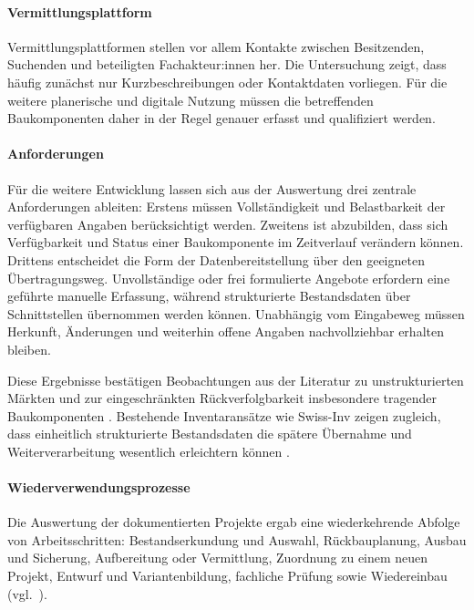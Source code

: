 \documentclass[type=zwischenbericht]{zukunftbau}
\begin{document}
\begin{SemioNest}
\begin{SemioNest}
\paragraph{Vermittlungsplattform}
Vermittlungsplattformen stellen vor allem Kontakte zwischen Besitzenden, Suchenden und beteiligten Fachakteur:innen her. Die Untersuchung zeigt, dass häufig zunächst nur Kurzbeschreibungen oder Kontaktdaten vorliegen. Für die weitere planerische und digitale Nutzung müssen die betreffenden Baukomponenten daher in der Regel genauer erfasst und qualifiziert werden.

\paragraph{Anforderungen}
Für die weitere Entwicklung lassen sich aus der Auswertung drei zentrale Anforderungen ableiten: Erstens müssen Vollständigkeit und Belastbarkeit der verfügbaren Angaben berücksichtigt werden. Zweitens ist abzubilden, dass sich Verfügbarkeit und Status einer Baukomponente im Zeitverlauf verändern können. Drittens entscheidet die Form der Datenbereitstellung über den geeigneten Übertragungsweg. Unvollständige oder frei formulierte Angebote erfordern eine geführte manuelle Erfassung, während strukturierte Bestandsdaten über Schnittstellen übernommen werden können. Unabhängig vom Eingabeweg müssen Herkunft, Änderungen und weiterhin offene Angaben nachvollziehbar erhalten bleiben.

Diese Ergebnisse bestätigen Beobachtungen aus der Literatur zu unstrukturierten Märkten und zur eingeschränkten Rückverfolgbarkeit insbesondere tragender Baukomponenten \cite{densley-tingley-cooper-cullen-structural-steel-reuse-2017,sivers-fivet-reuse-market-dynamics-2025}. Bestehende Inventaransätze wie Swiss-Inv zeigen zugleich, dass einheitlich strukturierte Bestandsdaten die spätere Übernahme und Weiterverarbeitung wesentlich erleichtern können \cite{cirkla-swiss-inv}.
\end{SemioNest}

\paragraph{Wiederverwendungsprozesse}
Die Auswertung der dokumentierten Projekte ergab eine wiederkehrende Abfolge von Arbeitsschritten: Bestandserkundung und Auswahl, Rückbauplanung, Ausbau und Sicherung, Aufbereitung oder Vermittlung, Zuordnung zu einem neuen Projekt, Entwurf und Variantenbildung, fachliche Prüfung sowie Wiedereinbau (vgl.\ ).


\end{SemioNest}
\end{document}
